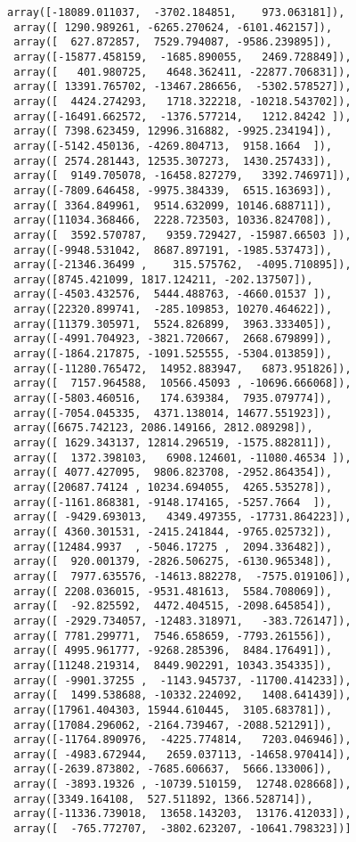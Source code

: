 \documentclass[11pt]{article}
\begin{document}
\begin{tcolorbox}[breakable, size=fbox, boxrule=.5pt, pad at break*=1mm, opacityfill=0]
\begin{Verbatim}[commandchars=\\\{\}]
 array([-18089.011037,  -3702.184851,    973.063181]),
 array([ 1290.989261, -6265.270624, -6101.462157]),
 array([  627.872857,  7529.794087, -9586.239895]),
 array([-15877.458159,  -1685.890055,   2469.728849]),
 array([   401.980725,   4648.362411, -22877.706831]),
 array([ 13391.765702, -13467.286656,  -5302.578527]),
 array([  4424.274293,   1718.322218, -10218.543702]),
 array([-16491.662572,  -1376.577214,   1212.84242 ]),
 array([ 7398.623459, 12996.316882, -9925.234194]),
 array([-5142.450136, -4269.804713,  9158.1664  ]),
 array([ 2574.281443, 12535.307273,  1430.257433]),
 array([  9149.705078, -16458.827279,   3392.746971]),
 array([-7809.646458, -9975.384339,  6515.163693]),
 array([ 3364.849961,  9514.632099, 10146.688711]),
 array([11034.368466,  2228.723503, 10336.824708]),
 array([  3592.570787,   9359.729427, -15987.66503 ]),
 array([-9948.531042,  8687.897191, -1985.537473]),
 array([-21346.36499 ,    315.575762,  -4095.710895]),
 array([8745.421099, 1817.124211, -202.137507]),
 array([-4503.432576,  5444.488763, -4660.01537 ]),
 array([22320.899741,  -285.109853, 10270.464622]),
 array([11379.305971,  5524.826899,  3963.333405]),
 array([-4991.704923, -3821.720667,  2668.679899]),
 array([-1864.217875, -1091.525555, -5304.013859]),
 array([-11280.765472,  14952.883947,   6873.951826]),
 array([  7157.964588,  10566.45093 , -10696.666068]),
 array([-5803.460516,   174.639384,  7935.079774]),
 array([-7054.045335,  4371.138014, 14677.551923]),
 array([6675.742123, 2086.149166, 2812.089298]),
 array([ 1629.343137, 12814.296519, -1575.882811]),
 array([  1372.398103,   6908.124601, -11080.46534 ]),
 array([ 4077.427095,  9806.823708, -2952.864354]),
 array([20687.74124 , 10234.694055,  4265.535278]),
 array([-1161.868381, -9148.174165, -5257.7664  ]),
 array([ -9429.693013,   4349.497355, -17731.864223]),
 array([ 4360.301531, -2415.241844, -9765.025732]),
 array([12484.9937  , -5046.17275 ,  2094.336482]),
 array([  920.001379, -2826.506275, -6130.965348]),
 array([  7977.635576, -14613.882278,  -7575.019106]),
 array([ 2208.036015, -9531.481613,  5584.708069]),
 array([  -92.825592,  4472.404515, -2098.645854]),
 array([ -2929.734057, -12483.318971,   -383.726147]),
 array([ 7781.299771,  7546.658659, -7793.261556]),
 array([ 4995.961777, -9268.285396,  8484.176491]),
 array([11248.219314,  8449.902291, 10343.354335]),
 array([ -9901.37255 ,  -1143.945737, -11700.414233]),
 array([  1499.538688, -10332.224092,   1408.641439]),
 array([17961.404303, 15944.610445,  3105.683781]),
 array([17084.296062, -2164.739467, -2088.521291]),
 array([-11764.890976,  -4225.774814,   7203.046946]),
 array([ -4983.672944,   2659.037113, -14658.970414]),
 array([-2639.873802, -7685.606637,  5666.133006]),
 array([ -3893.19326 , -10739.510159,  12748.028668]),
 array([3349.164108,  527.511892, 1366.528714]),
 array([-11336.739018,  13658.143203,  13176.412033]),
 array([  -765.772707,  -3802.623207, -10641.798323])]
\end{Verbatim}
\end{tcolorbox}
        
\end{document}
